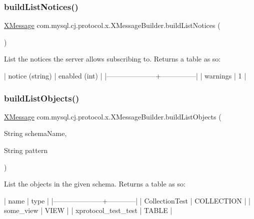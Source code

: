 \subsubsection{\texorpdfstring{build\+List\+Notices()}{buildListNotices()}}
{\footnotesize\ttfamily \mbox{\hyperlink{classcom_1_1mysql_1_1cj_1_1protocol_1_1x_1_1_x_message}{X\+Message}} com.\+mysql.\+cj.\+protocol.\+x.\+X\+Message\+Builder.\+build\+List\+Notices (\begin{DoxyParamCaption}{ }\end{DoxyParamCaption})}

List the notices the server allows subscribing to. Returns a table as so\+:


\begin{DoxyPre}
| notice (string)     | enabled (int) |
|---------------------+---------------|
| warnings            | 1             |
\end{DoxyPre}
 \mbox{\label{classcom_1_1mysql_1_1cj_1_1protocol_1_1x_1_1_x_message_builder_a961f7a690c9c3f57eddf39e332f6871d}} 
\subsubsection{\texorpdfstring{build\+List\+Objects()}{buildListObjects()}}
{\footnotesize\ttfamily \mbox{\hyperlink{classcom_1_1mysql_1_1cj_1_1protocol_1_1x_1_1_x_message}{X\+Message}} com.\+mysql.\+cj.\+protocol.\+x.\+X\+Message\+Builder.\+build\+List\+Objects (\begin{DoxyParamCaption}\item[{String}]{schema\+Name,  }\item[{String}]{pattern }\end{DoxyParamCaption})}

List the objects in the given schema. Returns a table as so\+:


\begin{DoxyPre}
| name                | type       |
|---------------------+------------|
| CollectionTest      | COLLECTION |
| some\_view           | VIEW       |
| xprotocol\_test\_test | TABLE      |
\end{DoxyPre}



